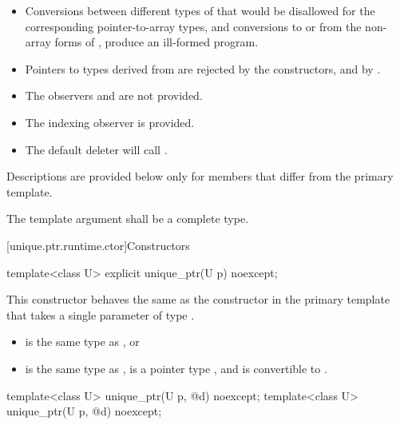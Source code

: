 \begin{itemize}
\item Conversions between different types of
that would be disallowed for the corresponding pointer-to-array types,
and conversions to or from the non-array forms of
, produce an ill-formed program.

\item Pointers to types derived from  are
rejected by the constructors, and by .

\item The observers  and
 are not provided.

\item The indexing observer  is provided.

\item The default deleter will call .
\end{itemize}

\pnum
Descriptions are provided below only for members that
differ from the primary template.

\pnum
The template argument  shall be a complete type.

[unique.ptr.runtime.ctor]{Constructors}

%
\begin{itemdecl}
template<class U> explicit unique_ptr(U p) noexcept;
\end{itemdecl}

\begin{itemdescr}
\pnum
This constructor behaves the same as
the constructor in the primary template that
takes a single parameter of type .

\pnum
\constraints
\begin{itemize}
\item {} is the same type as , or
\item {} is the same type as ,
 is a pointer type , and
 is convertible to .
\end{itemize}
\end{itemdescr}

%
\begin{itemdecl}
template<class U> unique_ptr(U p, @\seebelow@ d) noexcept;
template<class U> unique_ptr(U p, @\seebelow@ d) noexcept;
\end{itemdecl}

